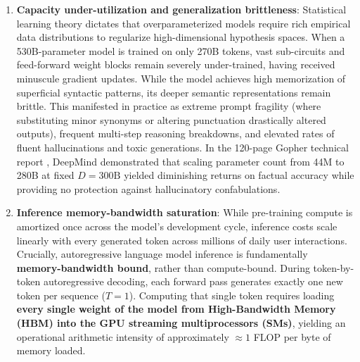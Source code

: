 \documentclass[../../main.tex]{subfiles}
\begin{document}
\begin{enumerate}
    \item \textbf{Capacity under-utilization and generalization brittleness}:
    Statistical learning theory dictates that overparameterized models require rich empirical data distributions to regularize high-dimensional hypothesis spaces. When a 530B-parameter model is trained on only 270B tokens, vast sub-circuits and feed-forward weight blocks remain severely under-trained, having received minuscule gradient updates. While the model achieves high memorization of superficial syntactic patterns, its deeper semantic representations remain brittle. This manifested in practice as extreme prompt fragility (where substituting minor synonyms or altering punctuation drastically altered outputs), frequent multi-step reasoning breakdowns, and elevated rates of fluent hallucinations and toxic generations. In the 120-page Gopher technical report \cite{rae2021gopher}, DeepMind demonstrated that scaling parameter count from 44M to 280B at fixed $D = 300\text{B}$ yielded diminishing returns on factual accuracy while providing no protection against hallucinatory confabulations.

    \item \textbf{Inference memory-bandwidth saturation}:
    While pre-training compute is amortized once across the model's development cycle, inference costs scale linearly with every generated token across millions of daily user interactions. Crucially, autoregressive language model inference is fundamentally \textbf{memory-bandwidth bound}, rather than compute-bound.
    During token-by-token autoregressive decoding, each forward pass generates exactly one new token per sequence ($T=1$). Computing that single token requires loading \textbf{every single weight of the model from High-Bandwidth Memory (HBM) into the GPU streaming multiprocessors (SMs)}, yielding an operational arithmetic intensity of approximately $\approx 1$ FLOP per byte of memory loaded.
    

\end{enumerate}
\end{document}
